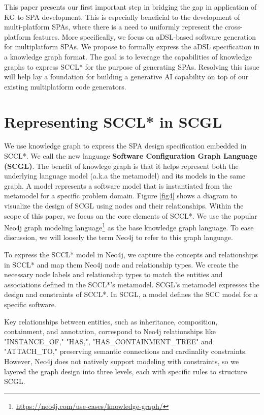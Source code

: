 \documentclass[runningheads]{llncs}
\begin{document}
This paper presents our first important step in bridging the gap in application of KG to SPA development. This is especially beneficial to the development of multi-platform SPAs, where there is a need to uniformly represent the cross-platform features. More specifically, we focus on aDSL-based software generation for multiplatform SPAs. We propose to formally express the aDSL specification in a knowledge graph format. The goal is to leverage the capabilities of knowledge graphs to express SCCL* for the purpose of generating SPAs. Resolving this issue will help lay a foundation for building a generative AI capability on top of our existing multiplatform code generators.

\section{Representing SCCL* in SCGL} \label{section3}
We use knowledge graph to express the SPA design specification embedded in SCCL*. We call the new language \textbf{Software Configuration Graph Language (SCGL)}. The benefit of knowlege graph is that it helps represent both the underlying language model (a.k.a the metamodel) and its models in the same graph. A model represents a software model that is instantiated from the metamodel for a specific problem domain. Figure \ref{fig4} shows a diagram to visualize the design of SCGL using nodes and their relationships. Within the scope of this paper, we focus on the core elements of SCCL*. We use the popular Neo4j graph modeling language\footnote{\url{https://neo4j.com/use-cases/knowledge-graph/}} as the base knowledge graph language. To ease discussion, we will loosely the term Neo4j to refer to this graph language.

To express the SCCL* model in Neo4j, we capture the concepts and relationships in SCCL* and map them Neo4j node and relationship types. We create the necessary node labels and relationship types to match the entities and associations defined in the SCCL*'s metamodel.
SCGL's metamodel expresses the design and constraints of SCCL*. In SCGL, a model defines the SCC model for a specific software.

Key relationships between entities, such as inheritance, composition, containment, and annotation, correspond to Neo4j relationships like "INSTANCE\_OF," "HAS,", "HAS\_CONTAINMENT\_TREE" and "ATTACH\_TO," preserving semantic connections and cardinality constraints. However, Neo4j does not natively support modeling with constraints, so we layered the graph design into three levels, each with specific rules to structure SCGL.
\end{document}
